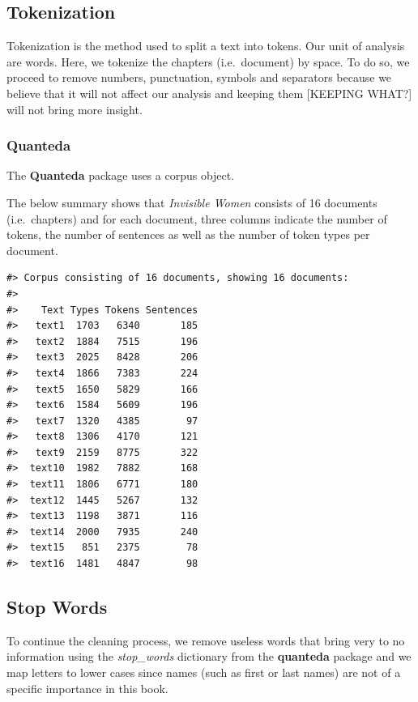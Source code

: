 \documentclass[
]{article}
\begin{document}
\hypertarget{tokenization}{%
\subsection{Tokenization}\label{tokenization}}

Tokenization is the method used to split a text into tokens. Our unit of
analysis are words. Here, we tokenize the chapters (i.e.~document) by
space. To do so, we proceed to remove numbers, punctuation, symbols and
separators because we believe that it will not affect our analysis and
keeping them {[}KEEPING WHAT?{]} will not bring more insight.

\hypertarget{quanteda}{%
\subsubsection{Quanteda}\label{quanteda}}

The \textbf{Quanteda} package uses a corpus object.

The below summary shows that \emph{Invisible Women} consists of 16
documents (i.e.~chapters) and for each document, three columns indicate
the number of tokens, the number of sentences as well as the number of
token types per document.

\begin{verbatim}
#> Corpus consisting of 16 documents, showing 16 documents:
#> 
#>    Text Types Tokens Sentences
#>   text1  1703   6340       185
#>   text2  1884   7515       196
#>   text3  2025   8428       206
#>   text4  1866   7383       224
#>   text5  1650   5829       166
#>   text6  1584   5609       196
#>   text7  1320   4385        97
#>   text8  1306   4170       121
#>   text9  2159   8775       322
#>  text10  1982   7882       168
#>  text11  1806   6771       180
#>  text12  1445   5267       132
#>  text13  1198   3871       116
#>  text14  2000   7935       240
#>  text15   851   2375        78
#>  text16  1481   4847        98
\end{verbatim}

\hypertarget{stop-words}{%
\subsection{Stop Words}\label{stop-words}}

To continue the cleaning process, we remove useless words that bring
very to no information using the \emph{stop\_words} dictionary from the
\textbf{quanteda} package and we map letters to lower cases since names
(such as first or last names) are not of a specific importance in this
book.
\end{document}
